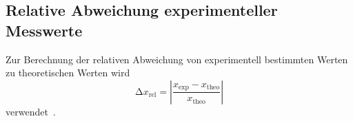 \subsection{Relative Abweichung experimenteller Messwerte}
Zur Berechnung der relativen Abweichung von experimentell bestimmten Werten zu theoretischen Werten wird 
\begin{equation}
    \increment x_{\mathrm{rel}} = \left| \frac{x_{\mathrm{\exp}}-x_{\mathrm{theo}}}{x_{\mathrm{theo}}}\right|
    \label{eqn:relabw}
\end{equation}
verwendet~\cite{relabw}. 

